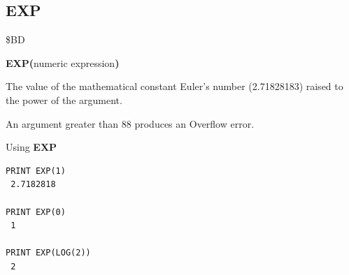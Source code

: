 \subsection{EXP}
\begin{description}[leftmargin=2cm,style=nextline]
\item [Token:]    \$BD

\item [Format:]   {\bf EXP(}numeric expression{\bf)}

\item [Returns:]  The value of the mathematical constant Euler's number (2.71828183) raised to the power of the argument.

\item [Remarks:]  An argument greater than 88 produces an Overflow error.

\item [Examples:] Using {\bf EXP}

\begin{tcolorbox}[colback=black,coltext=white]
\verbatimfont{\codefont}
\begin{verbatim}
PRINT EXP(1)
 2.7182818

PRINT EXP(0)
 1

PRINT EXP(LOG(2))
 2
\end{verbatim}
\end{tcolorbox}
\end{description}


\newpage
